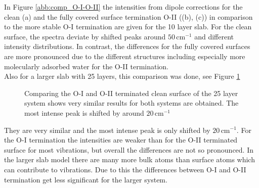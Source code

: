 \documentclass[11pt,DIV=13,BCOR=5mm,a4paper,headinclude]{scrbook}
\newcommand\todo[1]{\textcolor{red}{TODO: \textit{{#1}}}}
\begin{document}
In Figure \ref{abb:comp_O-I-O-II} the intensities from dipole corrections for the clean (a) and the fully covered surface termination O-II ((b), (c)) in comparison to the more stable O-I termination are given for the 10 layer slab.
For the clean surface, the spectra deviate by shifted peaks around $50\,$cm$^{-1}$ and different intensity distributions.
In contrast, the differences for the fully covered surfaces are more pronounced due to the different structures including especially more molecularly adsorbed water for the O-II termination.
\\
Also for a larger slab with 25 layers, this comparison was done, see Figure \ref{abb:comp_O-I-O-II_25}
\begin{figure}[!h]
 \centering
 \caption{Comparing the O-I and O-II terminated clean surface of the 25 layer system shows very similar results for both systems are obtained.
The most intense peak is shifted by around $20\,$cm$^{-1}$}%
 \label{abb:comp_O-I-O-II_25}
\end{figure}
They are very similar and the most intense peak is only shifted by $20\,$cm$^{-1}$.
For the O-I termination the intensities are weaker than for the O-II terminated surface for most vibrations, but overall the differences are not so pronounced.
In the larger slab model there are many more bulk atoms than surface atoms which can contribute to vibrations.
Due to this the differences between O-I and O-II termination get less significant for the larger system.
\\ %
\end{document}
